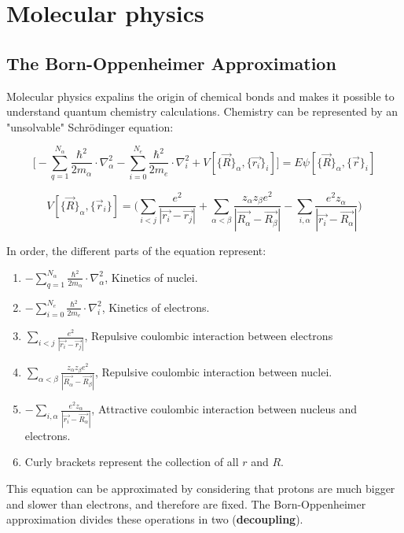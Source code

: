 \graphicspath{{chapters/07/}}
\chapter{Molecular physics}

\section{The Born-Oppenheimer Approximation}
Molecular physics expalins the origin of chemical bonds and makes it possible to understand quantum chemistry calculations.
Chemistry can be represented by an "unsolvable" Schr\"odinger equation:

$$\bigg[-\sum_{q=1}^{N_{\alpha}}\frac{\hbar^2}{2m_{\alpha}}\cdot\nabla_{\alpha}^2-\sum_{i=0}^{N_e}\frac{\hbar^2}{2m_e}\cdot\nabla^2_i+V[\{\vec{R}\}_{\alpha},\{\vec{r_i}\}_i]\bigg]=E\psi[\{\vec{R}\}_{\alpha},\{\vec{r}\}_i]$$

$$V[\{\vec{R}\}_{\alpha},\{\vec{r}_i\}]=\bigg(\sum_{i<j}\frac{e^2}{|\vec{r_i}-\vec{r_j}|}+\sum_{\alpha<\beta}\frac{z_{\alpha}z_{\beta}e^2}{|\vec{R_{\alpha}}-\vec{R_{\beta}}|}-\sum_{i,\alpha}\frac{e^2z_{\alpha}}{|\vec{r_i}-\vec{R_{\alpha}}|}\bigg)$$

In order, the different parts of the equation represent:

\begin{multicols}{2}
	\begin{enumerate}
		\item $-\sum_{q=1}^{N_{\alpha}}\frac{\hbar^2}{2m_{\alpha}}\cdot\nabla_{\alpha}^2$,  Kinetics of nuclei.
		\item $-\sum_{i=0}^{N_e}\frac{\hbar^2}{2m_e}\cdot\nabla^2_i$,  Kinetics of electrons.
		\item $\sum_{i<j}\frac{e^2}{|\vec{r_i}-\vec{r_j}|}$,  Repulsive coulombic interaction between electrons
		\item $\sum_{\alpha<\beta}\frac{z_{\alpha}z_{\beta}e^2}{|\vec{R_{\alpha}}-\vec{R_{\beta}}|}$,  Repulsive coulombic interaction between nuclei.
		\item $-\sum_{i,\alpha}\frac{e^2z_{\alpha}}{|\vec{r_i}-\vec{R_{\alpha}}|}$,  Attractive coulombic interaction between nucleus and electrons.
		\item Curly brackets represent the collection of all $r$ and $R$.
	\end{enumerate}
\end{multicols}

This equation can be approximated by considering that protons are much bigger and slower than electrons, and therefore are fixed.
The Born-Oppenheimer approximation divides these operations in two (\textbf{decoupling}).

